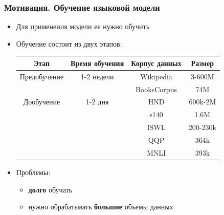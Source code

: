 \documentclass{beamer}
\begin{document}
\begin{frame}
	\frametitle{Мотивация. Обучение языковой модели}
	
	\begin{itemize}
		\item Для применения модели ее нужно обучить
		\item Обучение состоит из двух этапов:
			\begin{table}
				\begin{tabular}{|c|c|c|c|}
					\hline
					Этап & Время обучения & Корпус данных & Размер \\
					\hline
					Предобучение & 1-2 недели & Wikipedia & 3-600M \\
					&& BooksCorpus & 74M \\
					\hline
					Дообучение & 1-2 дня & HND & 600k-2M \\
					&& s140 & 1.6M\\
					&& ISWL & 200-230k \\
					&& QQP & 364k \\
					&& MNLI & 393k \\
					\hline
				\end{tabular}
			\end{table}
		\item Проблемы:
			\begin{itemize}
				\item {\bf долго} обучать
				\item нужно обрабатывать {\bf большие} объемы данных
			\end{itemize}
	\end{itemize}
\end{frame}
\end{document}
